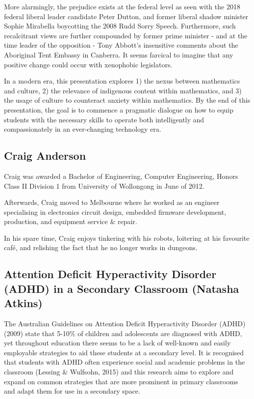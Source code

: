 \documentclass[twoside,14pt,a4paper,notitlepage]{memoir}
\begin{document}
More alarmingly, the prejudice exists at the federal level as seen with the 2018 federal liberal leader candidate Peter Dutton, and former liberal shadow minister Sophie Mirabella boycotting the 2008 Rudd Sorry Speech. Furthermore, such recalcitrant views are further compounded by former prime minister - and at the time leader of the opposition - Tony Abbott’s insensitive comments about the Aboriginal Tent Embassy in Canberra. It seems farcical to imagine that any positive change could occur with xenophobic legislators.
 
In a modern era, this presentation explores 1) the nexus between mathematics and culture, 2) the relevance of indigenous content within mathematics, and 3) the usage of culture to counteract anxiety within mathematics. By the end of this presentation, the goal is to commence a pragmatic dialogue on how to equip students with the necessary skills to operate both intelligently and compassionately in an ever-changing technology era.

\subsection*{Craig Anderson}

Craig was awarded a Bachelor of Engineering, Computer Engineering, Honors Class II Division 1 from University of Wollongong in June of 2012.

Afterwards, Craig moved to Melbourne where he worked as an engineer specialising in electronics circuit design, embedded firmware development, production, and equipment service \& repair.

In his spare time, Craig enjoys tinkering with his robots, loitering at his favourite café, and relishing the fact that he no longer works in dungeons.




\subsection*{Attention Deficit Hyperactivity Disorder (ADHD) in a Secondary Classroom (Natasha Atkins)}
\label{aut:atkins}

The Australian Guidelines on Attention Deficit Hyperactivity Disorder (ADHD) (2009) state that 5-10\% of children and adolescents are diagnosed with ADHD, yet throughout education there seems to be a lack of well-known and easily employable strategies to aid these students at a secondary level. It is recognised that students with ADHD often experience social and academic problems in the classroom (Lessing \& Wulfsohn, 2015) and this research aims to explore and expand on common strategies that are more prominent in primary classrooms and adapt them for use in a secondary space.
\end{document}
